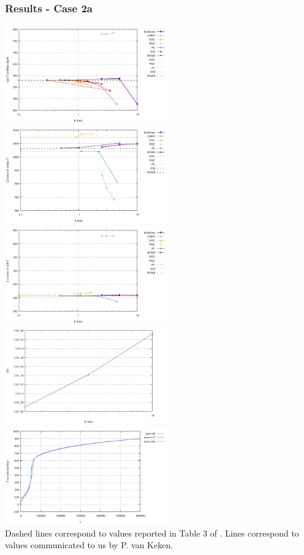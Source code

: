 \newpage
\subsubsection*{Results - Case 2a}

\begin{center}
\includegraphics[width=7cm]{python_codes/fieldstone_68/results/case2a/Tcorner}
\includegraphics[width=7cm]{python_codes/fieldstone_68/results/case2a/Twedge}\\
\includegraphics[width=7cm]{python_codes/fieldstone_68/results/case2a/Tslab}
\includegraphics[width=7cm]{python_codes/fieldstone_68/results/case2a/Tavrg}\\
\includegraphics[width=7cm]{python_codes/fieldstone_68/results/case2a/tempdiag}\\
{\captionfont Dashed lines correspond to values reported in Table 3 of \cite{vack08}.
Lines correspond to values communicated to us by P. van Keken.}
\end{center}

